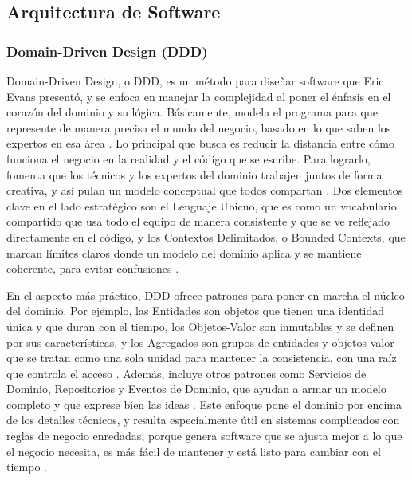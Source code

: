 \subsection{Arquitectura de Software}

\subsubsection{Domain-Driven Design (DDD)}

Domain-Driven Design, o DDD, es un método para diseñar software que Eric Evans presentó, y se enfoca en manejar la complejidad al poner el énfasis en el corazón del dominio y su lógica. Básicamente, modela el programa para que represente de manera precisa el mundo del negocio, basado en lo que saben los expertos en esa área \cite{Evans2003DDD}. Lo principal que busca es reducir la distancia entre cómo funciona el negocio en la realidad y el código que se escribe. Para lograrlo, fomenta que los técnicos y los expertos del dominio trabajen juntos de forma creativa, y así pulan un modelo conceptual que todos compartan \cite{WikipediaDDD}. Dos elementos clave en el lado estratégico son el Lenguaje Ubicuo, que es como un vocabulario compartido que usa todo el equipo de manera consistente y que se ve reflejado directamente en el código, y los Contextos Delimitados, o Bounded Contexts, que marcan límites claros donde un modelo del dominio aplica y se mantiene coherente, para evitar confusiones \cite{NetmentorDDD}.

En el aspecto más práctico, DDD ofrece patrones para poner en marcha el núcleo del dominio. Por ejemplo, las Entidades son objetos que tienen una identidad única y que duran con el tiempo, los Objetos-Valor son inmutables y se definen por sus características, y los Agregados son grupos de entidades y objetos-valor que se tratan como una sola unidad para mantener la consistencia, con una raíz que controla el acceso \cite{Evans2003DDD}. Además, incluye otros patrones como Servicios de Dominio, Repositorios y Eventos de Dominio, que ayudan a armar un modelo completo y que exprese bien las ideas \cite{NetmentorDDD}. Este enfoque pone el dominio por encima de los detalles técnicos, y resulta especialmente útil en sistemas complicados con reglas de negocio enredadas, porque genera software que se ajusta mejor a lo que el negocio necesita, es más fácil de mantener y está listo para cambiar con el tiempo \cite{WikipediaDDD}.

